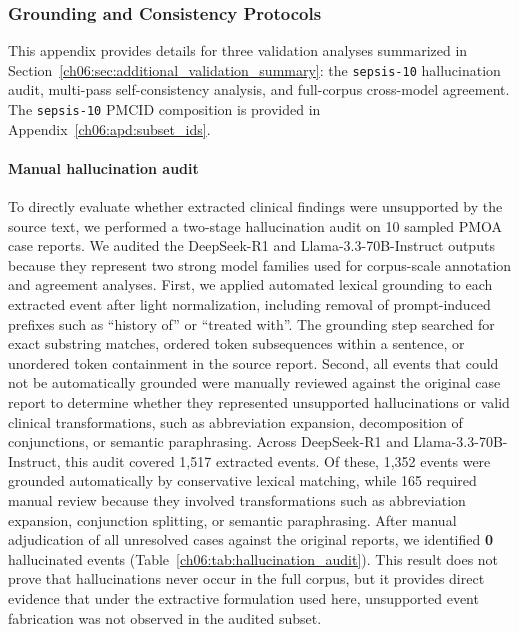 \subsubsection{Grounding and Consistency Protocols}
\label{ch06:apd:validation_details}

This appendix provides details for three validation analyses summarized in Section~\ref{ch06:sec:additional_validation_summary}: the \texttt{sepsis-10} hallucination audit, multi-pass self-consistency analysis, and full-corpus cross-model agreement.
The \texttt{sepsis-10} PMCID composition is provided in Appendix~\ref{ch06:apd:subset_ids}.

\paragraph{Manual hallucination audit}
\label{ch06:apd:hallucination_audit_results}
To directly evaluate whether extracted clinical findings were unsupported by the source text, we performed a two-stage hallucination audit on 10 sampled PMOA case reports.
We audited the DeepSeek-R1 and Llama-3.3-70B-Instruct outputs because they represent two strong model families used for corpus-scale annotation and agreement analyses.
First, we applied automated lexical grounding to each extracted event after light normalization, including removal of prompt-induced prefixes such as ``history of'' or ``treated with''.
The grounding step searched for exact substring matches, ordered token subsequences within a sentence, or unordered token containment in the source report.
Second, all events that could not be automatically grounded were manually reviewed against the original case report to determine whether they represented unsupported hallucinations or valid clinical transformations, such as abbreviation expansion, decomposition of conjunctions, or semantic paraphrasing.
Across DeepSeek-R1 and Llama-3.3-70B-Instruct, this audit covered 1,517 extracted events.
Of these, 1,352 events were grounded automatically by conservative lexical matching, while 165 required manual review because they involved transformations such as abbreviation expansion, conjunction splitting, or semantic paraphrasing.
After manual adjudication of all unresolved cases against the original reports, we identified \textbf{0} hallucinated events (Table~\ref{ch06:tab:hallucination_audit}).
This result does not prove that hallucinations never occur in the full corpus, but it provides direct evidence that under the extractive formulation used here, unsupported event fabrication was not observed in the audited subset.


